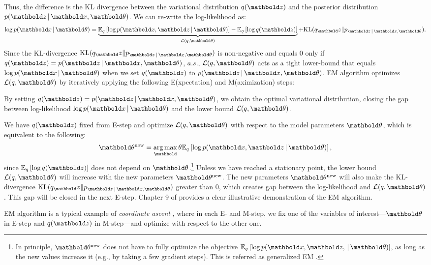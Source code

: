 Thus, the difference is the \gls{KL} divergence between the variational distribution $q(\mbz)$ and the posterior distribution $p(\mbz \g \mbx, \mb\theta)$. We can re-write the log-likelihood as:
\[
\log p(\mbx \g \mb\theta) = \underbrace{\EE{q}{\log p(\mbx, \mbz \g \mb\theta)} - \EE{q}{\log q(\mbz)}}_{\cL(q, \mb\theta)} + \textrm{KL}(q_\mbz\|p_{\mbz \g \mbx, \mb\theta}).
\]
Since the \gls{KL}-divergence $\textrm{KL}(q_\mbz\|p_{\mbz \g \mbx, \mb\theta})$ is non-negative and equals $0$ only if $q(\mbz) = p(\mbz \g \mbx, \mb\theta)$, $a.s.$, $\cL(q, \mb\theta)$ acts as a tight lower-bound that equals $\log p(\mbx \g \mb\theta)$ when we set $q(\mbz)$ to $p(\mbz \g \mbx, \mb\theta)$. \gls{EM} algorithm optimizes $\cL(q, \mb\theta)$ by iteratively applying the following E(xpectation) and M(aximization) steps:

 By setting $q(\mbz) = p(\mbz \g \mbx, \mb\theta)$, we obtain the optimal variational distribution, closing the gap between log-likelihood $\log p(\mbx \g \mb\theta)$ and the lower bound $\cL(q, \mb\theta)$. 

 We have $q(\mbz)$ fixed from E-step and optimize $\cL(q, \mb\theta)$ with respect to the model parameters $\mb\theta$, which is equivalent to the following:
\begin{equation*}
\mb\theta^\new = \argmax_\mb\theta \EE{q}{\log p(\mbx, \mbz \g \mb\theta)},
\end{equation*}
since $\EE{q}{\log q(\mbz)}$ does not depend on $\mb\theta$.\footnote{In principle, $\mb\theta^\new$ does not have to fully optimize the objective $\EE{q}{\log p(\mbx, \mbz, \g \mb\theta)}$, as long as the new values increase it (e.g., by taking a few gradient steps). This is referred as generalized \gls{EM} \citep{neal1998view}.} Unless we have reached a stationary point, the lower bound $\cL(q, \mb\theta)$ will increase with the new parameters $\mb\theta^\new$. The new parameters $\mb\theta^\new$ will also make the \gls{KL}-divergence $\textrm{KL}(q_\mbz\|p_{\mbz \g \mbx, \mb\theta})$ greater than $0$, which creates gap between the log-likelihood and $\cL(q, \mb{\theta})$. This gap will be closed in the next E-step. Chapter 9 of \citet{Bishop:2006:PRM:1162264} provides a clear illustrative demonstration of the \gls{EM} algorithm.  

\gls{EM} algorithm is a typical example of \textit{coordinate ascent} \citep{bertsekas1999nonlinear}, where in each E- and M-step, we fix one of the variables of interest---$\mb\theta$ in E-step and $q(\mbz)$ in M-step---and optimize with respect to the other one.


